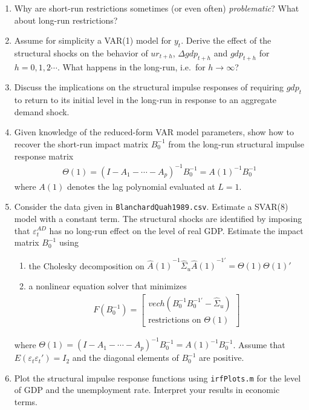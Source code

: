 \begin{enumerate}
\item Why are short-run restrictions sometimes (or even often) \emph{problematic}?
What about long-run restrictions?

\item Assume for simplicity a VAR{(1)} model for \(y_t\).
Derive the effect of the structural shocks on the behavior of
  \(ur_{t+h}\), \(\Delta gdp_{t+h}\) and \(gdp_{t+h}\) for \(h=0,1,2\cdots \).
What happens in the long-run, i.e.\ for \(h\rightarrow \infty \)?

\item Discuss the implications on the structural impulse responses of requiring \(gdp_t\)
  to return to its initial level in the long-run in response to an aggregate demand shock.

\item Given knowledge of the reduced-form VAR model parameters,
  show how to recover the short-run impact matrix \(B_{0}^{-1}\) from the long-run structural impulse response matrix
  \begin{align*}
  \Theta(1)={(I-A_{1}-\cdots -A_{p})}^{-1}B_{0}^{-1} = {A(1)}^{-1}B_{0}^{-1}
  \end{align*} 
  where \(A(1)\) denotes the lag polynomial evaluated at \(L=1\).

\item Consider the data given in \texttt{BlanchardQuah1989.csv}.
Estimate a SVAR{(8)} model with a constant term.
The structural shocks are identified by imposing that \(\varepsilon_t^{AD}\) has no long-run effect on the level of real GDP\@.
Estimate the impact matrix \(B_{0}^{-1}\) using 
\begin{enumerate}
\item the Cholesky decomposition on \({\hat{A}(1)}^{-1} \hat{\Sigma}_{u} {\hat{A}(1)}^{-1'}= \Theta(1) \Theta(1)'\)

\item a nonlinear equation solver that minimizes
\begin{align*}
F(B_{0}^{-1}) =
\begin{bmatrix}
vech(B_{0}^{-1}B_{0}^{-1'}-\hat{\Sigma}_u)
\\
\text{restrictions on } \Theta(1)
\end{bmatrix}
\end{align*}

\end{enumerate}
where \(\Theta(1)={(I-A_{1}-\cdots-A_{p})}^{-1}B_{0}^{-1} = {A(1)}^{-1}B_{0}^{-1}\).
Assume that \(E(\varepsilon_{t}\varepsilon_{t}')=I_{2}\) and the diagonal elements of \(B_{0}^{-1}\) are positive.

\item Plot the structural impulse response functions using \texttt{irfPlots.m} for the level of GDP and the unemployment rate.
Interpret your results in economic terms.
\end{enumerate}

